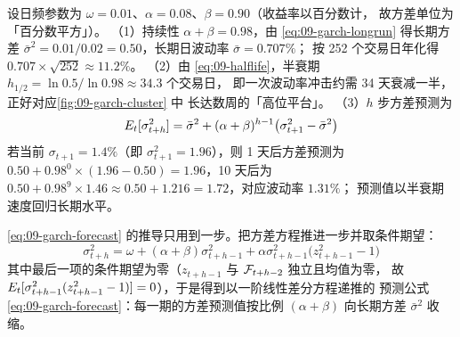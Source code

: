 \begin{example}\label{ex:09-garch}
设日频参数为 $\omega=0.01$、$\alpha=0.08$、$\beta=0.90$（收益率以百分数计，
故方差单位为「百分数平方」）。
（1）持续性 $\alpha+\beta=0.98$，由 \cref{eq:09-garch-longrun} 得长期方差
$\bar\sigma^2=0.01/0.02=0.50$，长期日波动率 $\bar\sigma=0.707\%$；
按 252 个交易日年化得 $0.707\times\sqrt{252}\approx 11.2\%$。
（2）由 \cref{eq:09-halflife}，半衰期 $h_{1/2}=\ln 0.5/\ln 0.98\approx 34.3$ 个交易日，
即一次波动率冲击约需 34 天衰减一半，正好对应\cref{fig:09-garch-cluster} 中
长达数周的「高位平台」。
（3）$h$ 步方差预测为
\begin{equation}\label{eq:09-garch-forecast}
  E_t[\sigma_{t+h}^{2}]=\bar\sigma^{2}+(\alpha+\beta)^{h-1}\bigl(\sigma_{t+1}^{2}-\bar\sigma^{2}\bigr)
\end{equation}
若当前 $\sigma_{t+1}=1.4\%$（即 $\sigma_{t+1}^2=1.96$），则 1 天后方差预测为
$0.50+0.98^{0}\times(1.96-0.50)=1.96$，10 天后为
$0.50+0.98^{9}\times 1.46\approx 0.50+1.216=1.72$，对应波动率 $1.31\%$；
预测值以半衰期速度回归长期水平。
\end{example}

\cref{eq:09-garch-forecast} 的推导只用到一步。把方差方程推进一步并取条件期望：
\begin{equation}\label{eq:09-garch-step}
  \sigma_{t+h}^{2}=\omega+(\alpha+\beta)\sigma_{t+h-1}^{2}
  +\alpha\sigma_{t+h-1}^{2}\bigl(z_{t+h-1}^{2}-1\bigr)
\end{equation}
其中最后一项的条件期望为零（$z_{t+h-1}$ 与 $\mathcal{F}_{t+h-2}$ 独立且均值为零，
故 $E_t[\sigma_{t+h-1}^2(z_{t+h-1}^2-1)]=0$），于是得到以一阶线性差分方程递推的
预测公式 \eqref{eq:09-garch-forecast}：每一期的方差预测值按比例 $(\alpha+\beta)$
向长期方差 $\bar\sigma^2$ 收缩。

